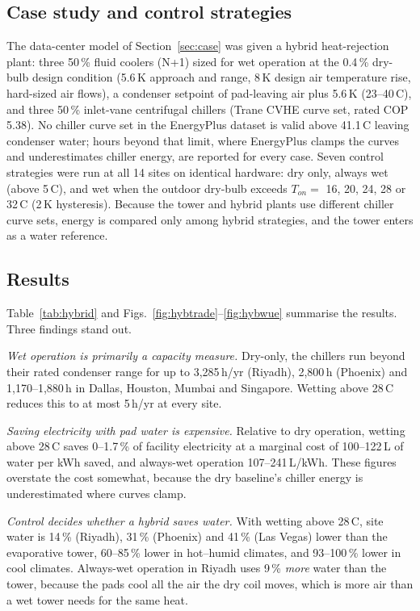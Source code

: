 \documentclass[preprint,12pt,authoryear]{elsarticle}
\begin{document}
\subsection{Case study and control strategies}
The data-center model of Section~\ref{sec:case} was given a hybrid heat-rejection plant: three 50\,\% fluid coolers
(N+1) sized for wet operation at the 0.4\,\% dry-bulb design condition (5.6\,K approach and range, 8\,K design air
temperature rise, hard-sized air flows), a condenser setpoint of pad-leaving air plus 5.6\,K (23--40\,\textdegree C), and
three 50\,\% inlet-vane centrifugal chillers (Trane CVHE curve set, rated COP 5.38). No chiller curve set in the
EnergyPlus dataset is valid above 41.1\,\textdegree C leaving condenser water; hours beyond that limit, where EnergyPlus
clamps the curves and underestimates chiller energy, are reported for every case. Seven control strategies were run
at all 14 sites on identical hardware: dry only, always wet (above 5\,\textdegree C), and wet when the outdoor
dry-bulb exceeds $T_{on}=$ 16, 20, 24, 28 or 32\,\textdegree C (2\,K hysteresis). Because the tower and hybrid plants use
different chiller curve sets, energy is compared only among hybrid strategies, and the tower enters as a water
reference.

\subsection{Results}
Table~\ref{tab:hybrid} and Figs.~\ref{fig:hybtrade}--\ref{fig:hybwue} summarise the results. Three findings stand out.

\emph{Wet operation is primarily a capacity measure.} Dry-only, the chillers run beyond their rated condenser range
for up to 3,285\,h/yr (Riyadh), 2,800\,h (Phoenix) and 1,170--1,880\,h in Dallas, Houston, Mumbai and Singapore. Wetting above
28\,\textdegree C reduces this to at most 5\,h/yr at every site.

\emph{Saving electricity with pad water is expensive.} Relative to dry operation, wetting above 28\,\textdegree C saves 0--1.7\,\%
of facility electricity at a marginal cost of 100--122\,L of water per kWh saved, and always-wet operation 107--241\,L/kWh.
These figures overstate the cost somewhat, because the dry baseline's chiller energy is underestimated where curves clamp.

\emph{Control decides whether a hybrid saves water.} With wetting above 28\,\textdegree C, site water is 14\,\% (Riyadh),
31\,\% (Phoenix) and 41\,\% (Las Vegas) lower than the evaporative tower, 60--85\,\% lower in hot--humid climates, and
93--100\,\% lower in cool climates. Always-wet operation in Riyadh uses 9\,\% \emph{more} water than the tower, because the
pads cool all the air the dry coil moves, which is more air than a wet tower needs for the same heat.
\end{document}
